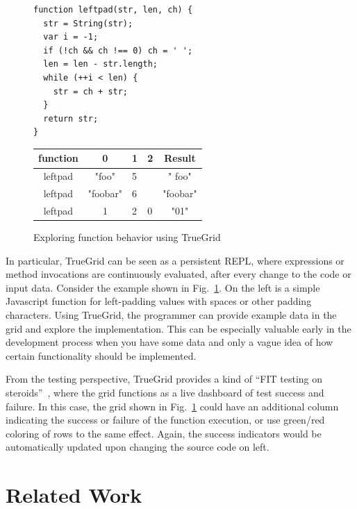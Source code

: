 \documentclass{llncs}
\begin{document}
\begin{figure}[t]
\begin{minipage}{0.6\linewidth}
\begin{lstlisting}
function leftpad(str, len, ch) {
  str = String(str);
  var i = -1;
  if (!ch && ch !== 0) ch = ' ';
  len = len - str.length;
  while (++i < len) {
    str = ch + str;
  }
  return str;
}
\end{lstlisting}
\end{minipage}
\begin{minipage}{0.4\linewidth}
\centering
\sffamily
\begin{tabular}{|c|c|m{0.5cm}|p{0.5cm}|c|}\hline
function & 0 & 1 & 2 & Result \\\hline\hline
leftpad & "foo" & 5 &  & "  foo" \\\hline
leftpad & "foobar" & 6 & & "foobar" \\\hline
leftpad & 1 & 2 & 0 & "01"\\\hline
\end{tabular}
\end{minipage}
\caption{Exploring function behavior using TrueGrid}
\label{FIG:leftpad}
\end{figure}

In particular, TrueGrid can be seen as a persistent REPL, where expressions or method invocations are continuously evaluated, after every change to the code or input data. 
Consider the example shown in Fig.~\ref{FIG:leftpad}.
On the left is a simple Javascript function for left-padding values with spaces or other padding characters. 
Using TrueGrid, the programmer can provide example data in the grid and explore the implementation. This can be especially valuable early in the development process when  you have some data and only a vague idea of how certain functionality should be implemented.

From the testing perspective, TrueGrid provides a kind of ``FIT testing on steroids''~\cite{mugridge2005fit}, where the grid functions as a live dashboard of test success and failure. 
In this case, the grid shown in Fig.~\ref{FIG:leftpad} could have an additional column indicating the success or failure of the function execution, or use green/red coloring of rows to the same effect.
Again, the success indicators would be automatically updated upon changing the source code on left. 

\section{Related Work}
\end{document}
